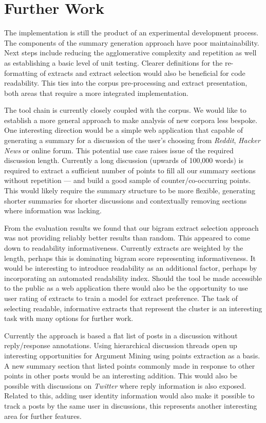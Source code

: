   \section{Further Work}
    The implementation is still the product of an experimental development process. The components of the summary generation approach have poor maintainability. Next steps include reducing the agglomerative complexity and repetition as well as establishing a basic level of unit testing. Clearer definitions for the re-formatting of extracts and extract selection would also be beneficial for code readability. This ties into the corpus pre-processing and extract presentation, both areas that require a more integrated implementation.

    The tool chain is currently closely coupled with the corpus. We would like to establish a more general approach to make analysis of new corpora less bespoke. One interesting direction would be a simple web application that capable of generating a summary for a discussion of the user's choosing from \textit{Reddit}, \textit{Hacker News} or online forum. This potential use case raises issue of the required discussion length. Currently a long discussion (upwards of 100,000 words) is required to extract a sufficient number of points to fill all our summary sections without repetition --- and build a good sample of counter/co-occurring points. This would likely require the summary structure to be more flexible, generating shorter summaries for shorter discussions and contextually removing sections where information was lacking.

    From the evaluation results we found that our bigram extract selection approach was not providing reliably better results than random. This appeared to come down to readability informativeness. Currently extracts are weighted by the length, perhaps this is dominating bigram score representing informativeness. It would be interesting to introduce readability as an additional factor, perhaps by incorporating an automated readability index. Should the tool be made accessible to the public as a web application there would also be the opportunity to use user rating of extracts to train a model for extract preference. The task of selecting readable, informative extracts that represent the cluster is an interesting task with many options for further work.

    Currently the approach is based a flat list of posts in a discussion without reply/response annotations. Using hierarchical discussion threads open up interesting opportunities for Argument Mining using points extraction as a basis. A new summary section that listed points commonly made in response to other points in other posts would be an interesting addition. This would also be possible with discussions on \textit{Twitter} where reply information is also exposed. Related to this, adding user identity information would also make it possible to track a posts by the same user in discussions, this represents another interesting area for further features.

